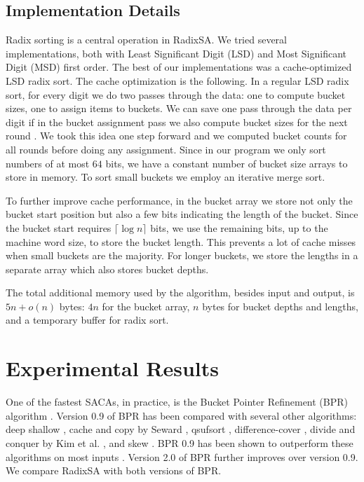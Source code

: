 \subsection{Implementation Details}
Radix sorting is a central operation in RadixSA. We tried several implementations,
 both with Least Significant Digit (LSD) and Most Significant Digit (MSD) first order. 
The best of our implementations was a cache-optimized LSD radix sort. The cache optimization 
is the following. In a regular LSD radix sort, for every digit we
do two passes through the data: one to compute bucket sizes, one to assign
items to buckets. We can save one pass through the data per digit if in the bucket assignment pass we 
also compute bucket sizes for the next round \cite{LaMarca97}. We
took this idea one step forward and we computed bucket counts for all
rounds before doing any assignment. Since in our program we only sort numbers of
at most $64$ bits, we have a constant number of bucket size arrays to store in
memory. To sort small buckets we employ an iterative merge sort.

To further improve cache performance, in the bucket array we store not only the bucket start
position but also a few bits indicating the
length of the bucket. Since the bucket start requires $\lceil \log n
\rceil$ bits, we use the remaining bits, up to the machine word size, to
store the bucket length. This prevents a lot of cache misses when small buckets are the
majority. For longer buckets, we store the lengths in a separate array which also stores 
bucket depths.


The total additional memory used by the algorithm, besides input and output, is
 $5n + o(n)$ bytes: $4n$ for the bucket array, $n$ bytes for bucket depths and lengths, 
 and a temporary buffer for radix sort.

 
\section{Experimental Results}
One of the fastest SACAs,
in practice, is the Bucket Pointer Refinement (BPR) algorithm \cite{ScSt07}.
Version 0.9 of BPR has been compared \cite{ScSt07} with several other
algorithms: deep shallow \cite{MaFe04}, cache and copy by Seward \cite{Sew2000}, 
qsufsort \cite{LaSa07}, difference-cover \cite{BuKa03}, 
divide and conquer by Kim et al. \cite{KJP04}, and skew \cite{KaSa03}. BPR 0.9 has been
shown to outperform these algorithms on most inputs \cite{ScSt07}. 
Version 2.0 of BPR further improves over version 0.9. We compare RadixSA with both versions of 
BPR. 


